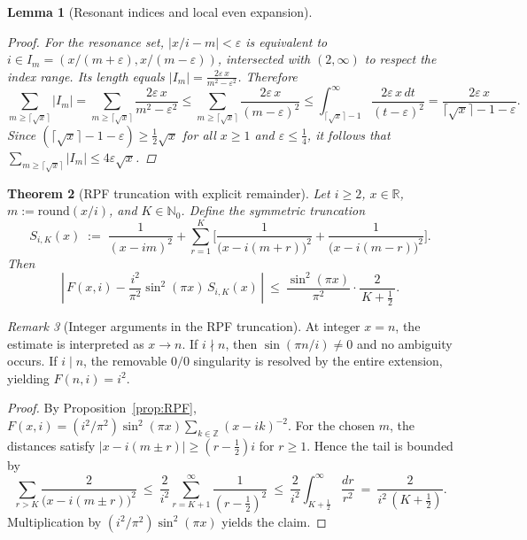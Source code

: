 \documentclass[11pt,a4paper]{amsart}
\theoremstyle{plain}
\newtheorem{theorem}{Theorem}[section]
\newtheorem{lemma}[theorem]{Lemma}
\theoremstyle{definition}
\theoremstyle{remark}
\newtheorem{remark}[theorem]{Remark}
\begin{document}
\begin{lemma}[Resonant indices and local even expansion]
\begin{proof}
For the resonance set, $|x/i-m|<\varepsilon$ is equivalent to $i\in I_m=(x/(m+\varepsilon),x/(m-\varepsilon))$, intersected with $(2,\infty)$ to respect the index range. Its length equals $|I_m|=\frac{2\varepsilon\,x}{m^2-\varepsilon^2}$. Therefore
\[
\sum_{m\ge \lceil \sqrt{x}\rceil}\! |I_m|
=\sum_{m\ge \lceil \sqrt{x}\rceil}\frac{2\varepsilon\,x}{m^2-\varepsilon^2}
\le \sum_{m\ge \lceil \sqrt{x}\rceil}\frac{2\varepsilon\,x}{(m-\varepsilon)^2}
\le \int_{\lceil \sqrt{x}\rceil-1}^{\infty}\frac{2\varepsilon\,x\,dt}{(t-\varepsilon)^2}
=\frac{2\varepsilon\,x}{\lceil \sqrt{x}\rceil-1-\varepsilon}.
\]
Since $(\lceil \sqrt{x}\rceil-1-\varepsilon)\ge \frac12\sqrt{x}$ for all $x\ge 1$ and $\varepsilon\le \tfrac14$, it follows that $\sum_{m\ge \lceil \sqrt{x}\rceil}|I_m|\le 4\varepsilon\sqrt{x}$.
\end{proof}
\end{lemma}


\begin{theorem}[RPF truncation with explicit remainder]\label{thm:RPF-trunc}
Let $i\ge 2$, $x\in\mathbb{R}$, $m:=\mathrm{round}(x/i)$, and $K\in\mathbb{N}_0$. Define the symmetric truncation
\[
S_{i,K}(x)\;:=\;\frac{1}{(x-i m)^{2}}+\sum_{r=1}^{K}\Biggl[\frac{1}{\bigl(x-i(m+r)\bigr)^{2}}+\frac{1}{\bigl(x-i(m-r)\bigr)^{2}}\Biggr].
\]
Then
\[
\left|\,F(x,i)-\frac{i^{2}}{\pi^{2}}\sin^{2}(\pi x)\,S_{i,K}(x)\,\right|
\ \le\ \frac{\sin^{2}(\pi x)}{\pi^{2}}\cdot \frac{2}{\,K+\tfrac12\,}.
\]
\end{theorem}

\begin{remark}[Integer arguments in the RPF truncation]
At integer $x=n$, the estimate is interpreted as $x\to n$. If $i\nmid n$, then $\sin(\pi n/i)\neq 0$ and no ambiguity occurs. If $i\mid n$, the removable $0/0$ singularity is resolved by the entire extension, yielding $F(n,i)=i^2$.
\end{remark}

\begin{proof}
By Proposition~\ref{prop:RPF}, $F(x,i)=(i^{2}/\pi^{2})\sin^{2}(\pi x)\sum_{k\in\mathbb{Z}}(x-ik)^{-2}$. For the chosen $m$, the distances satisfy $|x-i(m\pm r)|\ge (r-\tfrac12)i$ for $r\ge 1$. Hence the tail is bounded by
\[
\sum_{r>K}\frac{2}{\bigl(x-i(m\pm r)\bigr)^{2}}
\ \le\ \frac{2}{i^{2}}\sum_{r=K+1}^{\infty}\frac{1}{(r-\tfrac12)^{2}}
\ \le\ \frac{2}{i^{2}}\int_{K+\tfrac12}^{\infty}\frac{dr}{r^{2}}
\ =\ \frac{2}{i^{2}\,(K+\tfrac12)}.
\]
Multiplication by $(i^{2}/\pi^{2})\sin^{2}(\pi x)$ yields the claim.
\end{proof}
\end{document}
